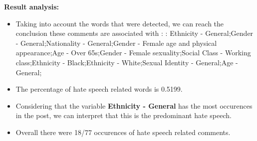 \documentclass[11pt]{article}
\begin{document}
\textbf{\Large Result analysis:}

\begin{itemize}\item Taking into account the words that were detected, we can reach the conclusion these comments are associated with : : Ethnicity - General;Gender - General;Nationality - General;Gender - Female age and physical appearance;Age - Over 65s;Gender - Female sexuality;Social Class - Working class;Ethnicity - Black;Ethnicity - White;Sexual Identity - General;Age - General;%

\item The percentage of hate speech related words is 0.5199.

\item Considering that the variable \textbf{Ethnicity - General} has the most occurences in the post, we can interpret that this is the predominant hate speech.

\item Overall there were 18/77 occurences of hate speech related comments.\end{itemize}
\end{document}
